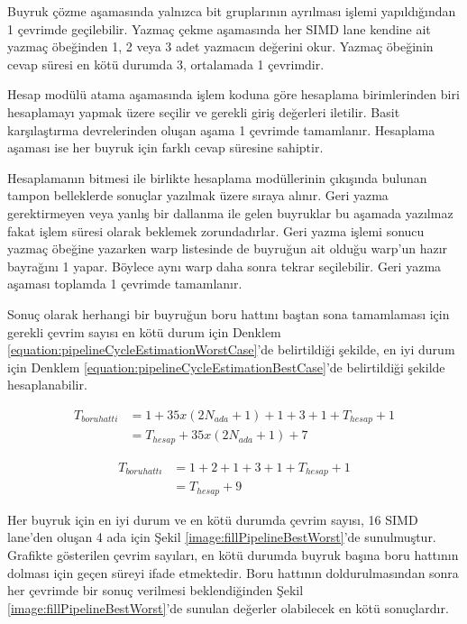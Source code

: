 Buyruk çözme aşamasında yalnızca bit gruplarının ayrılması işlemi yapıldığından 1 çevrimde geçilebilir. Yazmaç çekme aşamasında her SIMD lane kendine ait yazmaç öbeğinden 1, 2 veya 3 adet yazmacın değerini okur. Yazmaç öbeğinin cevap süresi en kötü durumda 3, ortalamada 1 çevrimdir.\par
Hesap modülü atama aşamasında işlem koduna göre hesaplama birimlerinden biri hesaplamayı yapmak üzere seçilir ve gerekli giriş değerleri iletilir. Basit karşılaştırma devrelerinden oluşan aşama 1 çevrimde tamamlanır. Hesaplama aşaması ise her buyruk için farklı cevap süresine sahiptir. \par
Hesaplamanın bitmesi ile birlikte hesaplama modüllerinin çıkışında bulunan tampon belleklerde sonuçlar yazılmak üzere sıraya alınır. Geri yazma gerektirmeyen veya yanlış bir dallanma ile gelen buyruklar bu aşamada yazılmaz fakat işlem süresi olarak beklemek zorundadırlar. Geri yazma işlemi sonucu yazmaç öbeğine yazarken warp listesinde de buyruğun ait olduğu warp'un hazır bayrağını 1 yapar. Böylece aynı warp daha sonra tekrar seçilebilir. Geri yazma aşaması toplamda 1 çevrimde tamamlanır.\par

Sonuç olarak herhangi bir buyruğun boru hattını baştan sona tamamlaması için gerekli çevrim sayısı en kötü durum için Denklem \ref{equation:pipelineCycleEstimationWorstCase}'de belirtildiği şekilde, en iyi durum için Denklem \ref{equation:pipelineCycleEstimationBestCase}'de belirtildiği şekilde hesaplanabilir.\par

\begin{align} \label{equation:pipelineCycleEstimationWorstCase}
	T_{boru hatti} 	&= 1 + 35x(2N_{ada} + 1) + 1 + 3 + 1 + T_{hesap} + 1 \\
									&= T_{hesap} + 35 x (2N_{ada}+1) + 7
\end{align}

\begin{align} \label{equation:pipelineCycleEstimationBestCase}
	T_{boru hattı}  &= 1 + 2 + 1 + 3 + 1 + T_{hesap} + 1 \\
									&= T_{hesap} + 9
\end{align}

Her buyruk için en iyi durum ve en kötü durumda çevrim sayısı, 16 SIMD lane'den oluşan 4 ada için Şekil \ref{image:fillPipelineBestWorst}'de sunulmuştur. Grafikte gösterilen çevrim sayıları, en kötü durumda buyruk başına boru hattının dolması için geçen süreyi ifade etmektedir. Boru hattının doldurulmasından sonra her çevrimde bir sonuç verilmesi beklendiğinden Şekil \ref{image:fillPipelineBestWorst}'de sunulan değerler olabilecek en kötü sonuçlardır.\par



